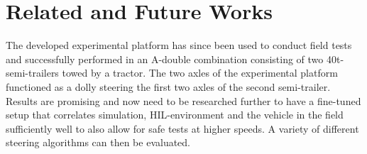 \documentclass[root.tex]{subfiles}
\begin{document}
	
	{\pagestyle{empty}}
	\section{Related and Future Works}
	\label{chap:Related_works}
	
	The developed experimental platform has since been used to conduct field tests and successfully performed in an A-double combination consisting of two 40t-semi-trailers towed by a tractor. The two axles of the experimental platform functioned as a dolly steering the first two axles of the second semi-trailer. Results are promising and now need to be researched further to have a fine-tuned setup that correlates simulation, \gls{HIL}-environment and the vehicle in the field sufficiently well to also allow for safe tests at higher speeds. A variety of different steering algorithms can then be evaluated.
	
	
\end{document}
